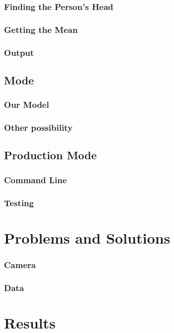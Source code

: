 \subsubsection*{Finding the Person’s Head}
\subsubsection*{Getting the Mean }
\subsubsection*{Output}
\subsection*{Mode}
\subsubsection*{Our Model}
\subsubsection*{Other possibility}

\subsection*{Production Mode}
\subsubsection*{Command Line}
\subsubsection*{Testing}

\section*{Problems and Solutions}

\subsubsection*{Camera}
\subsubsection*{Data}

\section*{Results}

